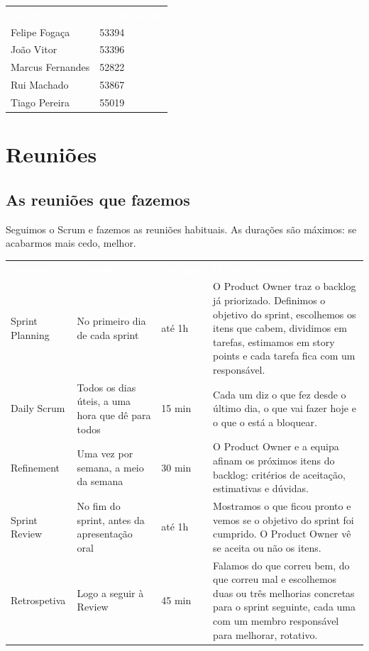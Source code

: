 \documentclass[11pt,a4paper]{article}
\newcommand{\th}[1]{\textcolor{white}{\sffamily\bfseries #1}}
\begin{document}
\renewcommand{\arraystretch}{2.2}
\begin{tabularx}{\textwidth}{Y L{5.2cm}}
   \th{Nome} & \th{N.º de aluno} \\
   Felipe Fogaça    & 53394 \\ \hline
          João Vitor       & 53396 \\ \hline
   Marcus Fernandes & 52822 \\ \hline
          Rui Machado      & 53867 \\ \hline
   Tiago Pereira    & 55019 \\ \hline
\end{tabularx}
\renewcommand{\arraystretch}{1}

\section{Reuniões}

\subsection{As reuniões que fazemos}

Seguimos o Scrum e fazemos as reuniões habituais. As durações são máximos: se acabarmos mais cedo, melhor.

\small
\renewcommand{\arraystretch}{1.45}
\begin{tabularx}{\textwidth}{N{2.5cm} L{3.2cm} L{1.7cm} Y}
   \th{Reunião} & \th{Quando} & \th{Duração} & \th{O que fazemos} \\
  Sprint Planning & No primeiro dia de cada sprint & até 1h &
    O Product Owner traz o backlog já priorizado. Definimos o objetivo do sprint, escolhemos os itens que cabem, dividimos em tarefas, estimamos em story points e cada tarefa fica com um responsável. \\
  Daily Scrum & Todos os dias úteis, a uma hora que dê para todos & 15 min &
    Cada um diz o que fez desde o último dia, o que vai fazer hoje e o que o está a bloquear. \\
  Refinement & Uma vez por semana, a meio da semana & 30 min &
    O Product Owner e a equipa afinam os próximos itens do backlog: critérios de aceitação, estimativas e dúvidas. \\
  Sprint Review & No fim do sprint, antes da apresentação oral & até 1h &
    Mostramos o que ficou pronto e vemos se o objetivo do sprint foi cumprido. O Product Owner vê se aceita ou não os itens. \\
  Retrospetiva & Logo a seguir à Review & 45 min &
    Falamos do que correu bem, do que correu mal e escolhemos duas ou três melhorias concretas para o sprint seguinte, cada uma com um membro responsável para melhorar, rotativo. \\
  \bottomrule
\end{tabularx}
\renewcommand{\arraystretch}{1}
\normalsize
\end{document}
